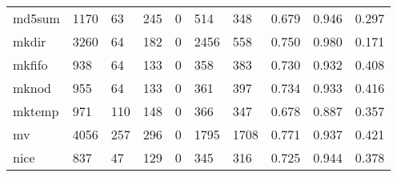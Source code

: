 \begin{longtable}{lp{2.0cm}p{2.0cm}p{2.0cm}p{2.0cm}p{2.0cm}p{2.0cm}p{2.0cm}p{2.0cm}p{2.0cm}}
md5sum    &                   1170 &                                 63 &                               245 &                                0 &                               514 &                             348 &                                   0.679 &                                  0.946 &                                0.297 \\
mkdir     &                   3260 &                                 64 &                               182 &                                0 &                              2456 &                             558 &                                   0.750 &                                  0.980 &                                0.171 \\
mkfifo    &                    938 &                                 64 &                               133 &                                0 &                               358 &                             383 &                                   0.730 &                                  0.932 &                                0.408 \\
mknod     &                    955 &                                 64 &                               133 &                                0 &                               361 &                             397 &                                   0.734 &                                  0.933 &                                0.416 \\
mktemp    &                    971 &                                110 &                               148 &                                0 &                               366 &                             347 &                                   0.678 &                                  0.887 &                                0.357 \\
mv        &                   4056 &                                257 &                               296 &                                0 &                              1795 &                            1708 &                                   0.771 &                                  0.937 &                                0.421 \\
nice      &                    837 &                                 47 &                               129 &                                0 &                               345 &                             316 &                                   0.725 &                                  0.944 &                                0.378 \\

\end{longtable}
